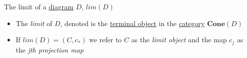 The limit of a \href{doc/1 math/Seven Sketches in Compositionality/Chapter 3: Databases/5 Introduction to limits and colimits/2 Limits/4 Cone}{diagram} $D$, $lim(D)$

\begin{itemize}
    \item  The \emph{limit} of $D$, denoted is the \href{doc/1 math/Seven Sketches in Compositionality/Chapter 3: Databases/5 Introduction to limits and colimits/1 Terminal objects and products/1 Terminal object}{terminal object} in the \href{doc/1 math/Seven Sketches in Compositionality/Chapter 3: Databases/2 Categories/1 Free Categories/1 Category}{category} $\mathbf{Cone}(D)$
    \item If $lim(D)=(C,c_*)$ we refer to $C$ as the \emph{limit object} and the map $c_j$ as the \emph{jth projection map}

  \end{itemize}
